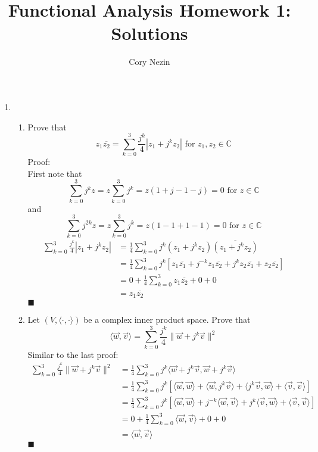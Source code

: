 \documentclass[12pt]{article}
\title{Functional Analysis Homework 1: Solutions}
\author{Cory Nezin}
\begin{document}
\maketitle
\begin{enumerate}
\item
\begin{enumerate}
\item Prove that
$$ z_1\overline{z_2} = \sum_{k=0}^3 \frac{j^k}{4}|z_1 + j^kz_2| \text{ for } 
z_1,z_2 \in \mathbb{C}$$
Proof:\\
First note that 
$$\sum_{k=0}^3 j^k z = z\sum_{k=0}^3j^k = z(1 + j -1 -j) = 0 \text{ for } z \in \mathbb{C}$$
and
$$\sum_{k=0}^3 j^{2k} z = z\sum_{k=0}^3j^k = z(1 -1 +1 -1) = 0 \text{ for } z \in \mathbb{C}$$
\begin{align*}
\sum_{k=0}^3 \frac{j^k}{4}|z_1 + j^kz_2| &= \frac{1}{4}\sum_{k=0}^3 j^k (z_1+j^kz_2)\overline{(z_1+j^kz_2)}\\
&= \frac{1}{4}\sum_{k=0}^3 j^k [z_1\overline{z_1} + j^{-k}z_1\overline{z_2} + j^kz_2\overline{z_1} + z_2\overline{z_2}]\\
&= 0 + \frac{1}{4}\sum_{k=0}^3 z_1\overline{z_2} + 0 + 0\\
&= z_1\overline{z_2}
\end{align*}
$\blacksquare$
\item Let $(V,\langle\cdot,\cdot\rangle)$ be a complex inner product space.  Prove that\\
$$\langle \vec{w},\vec{v}\rangle = \sum_{k=0}^3 \frac{j^k}{4} \lVert \vec{w} + 
j^k\vec{v}\rVert^2$$
Similar to the last proof:
\begin{align*}
\sum_{k=0}^3 \frac{j^k}{4}\lVert \vec{w} + j^k\vec{v}\rVert^2 &= \frac{1}{4}\sum_{k=0}^3 j^k \langle \vec{w}+j^k\vec{v},\vec{w}+j^k\vec{v}\rangle\\
&= \frac{1}{4}\sum_{k=0}^3 j^k [\langle \vec{w},\vec{w} \rangle + \langle \vec{w},j^k\vec{v} \rangle + \langle j^k\vec{v},\vec{w} \rangle + \langle \vec{v}, \vec{v} \rangle]\\
&= \frac{1}{4}\sum_{k=0}^3 j^k [\langle \vec{w},\vec{w} \rangle + j^{-k}\langle \vec{w},\vec{v} \rangle + j^k \langle \vec{v},\vec{w} \rangle + \langle \vec{v}, \vec{v} \rangle]\\
&= 0 + \frac{1}{4}\sum_{k=0}^3 \langle \vec{w},\vec{v} \rangle + 0 + 0\\
&= \langle \vec{w},\vec{v} \rangle
\end{align*}
$\blacksquare$
\end{enumerate}
\end{enumerate}
\end{document}
